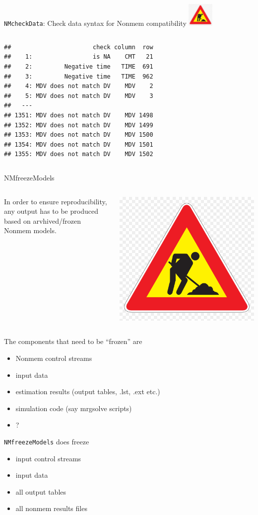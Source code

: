 \documentclass[
  8pt,
  ignorenonframetext,
  aspectratio=169]{beamer}
\providecommand{\tightlist}{%
  \setlength{\itemsep}{0pt}\setlength{\parskip}{0pt}}
\begin{document}
\begin{frame}[fragile]{\texttt{NMcheckData}: Check data syntax for
Nonmem compatibility
\includegraphics[width=0.5in]{figures/worksign.png}}
\begin{columns}[T]
\begin{column}{0.48\textwidth}
\begin{verbatim}
##                       check column  row
##    1:                 is NA    CMT   21
##    2:         Negative time   TIME  691
##    3:         Negative time   TIME  962
##    4: MDV does not match DV    MDV    2
##    5: MDV does not match DV    MDV    3
##   ---                                  
## 1351: MDV does not match DV    MDV 1498
## 1352: MDV does not match DV    MDV 1499
## 1353: MDV does not match DV    MDV 1500
## 1354: MDV does not match DV    MDV 1501
## 1355: MDV does not match DV    MDV 1502
\end{verbatim}
\end{column}
\end{columns}
\end{frame}

\begin{frame}[fragile]{NMfreezeModels}
\protect\hypertarget{nmfreezemodels}{}
\begin{columns}[T]
\begin{column}{0.85\textwidth}
In order to ensure reproducibility, any output has to be produced based
on arvhived/frozen Nonmem models.
\end{column}

\begin{column}{0.15\textwidth}
\includegraphics[width=.5in]{figures/worksign.png}
\end{column}
\end{columns}

The components that need to be ``frozen'' are

\begin{itemize}
\tightlist
\item
  Nonmem control streams
\item
  input data
\item
  estimation results (output tables, .lst, .ext etc.)
\item
  simulation code (say mrgsolve scripts)
\item
  ?
\end{itemize}

\texttt{NMfreezeModels} does freeze

\begin{itemize}
\tightlist
\item
  input control streams
\item
  input data
\item
  all output tables
\item
  all nonmem results files
\end{itemize}


\end{frame}
\end{document}

